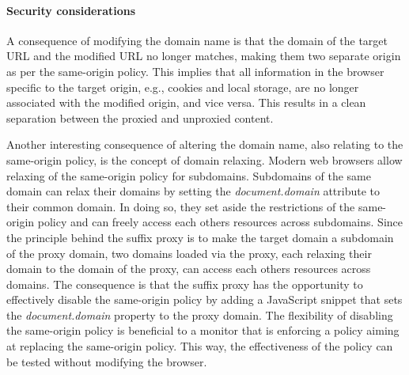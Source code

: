 \documentclass{llncs}
\newcommand{\todo}[1]{\colorbox{red}{\textcolor{white}{\sffamily\bfseries\scriptsize TODO}} \textcolor{red}{#1} \textcolor{red}{$\blacktriangleleft$}}
\begin{document}






\paragraph{Security considerations}

A consequence of modifying the domain name is that the domain of the
target URL and the modified URL no longer matches, making them two 
separate origin as per the same-origin policy. This implies that all information in 
the browser specific to the target origin, e.g., cookies and local storage, 
are no longer associated with the modified origin, and vice versa. This results 
in a clean separation between the proxied and unproxied content.  

Another interesting consequence of altering the domain name, also relating to 
the same-origin policy, is the concept of domain relaxing. Modern web browsers 
allow relaxing of the same-origin policy for subdomains. Subdomains of the same 
domain can relax their domains by setting the \emph{document.domain} attribute
to their common domain. In doing so, they set aside the restrictions of the 
same-origin policy and can freely access each others resources across subdomains. 
Since the principle behind the suffix proxy is to make the target domain a subdomain of the proxy domain, two 
domains loaded via the proxy, each relaxing their domain to the domain of the 
proxy, can access each others resources across domains.
The consequence is that the suffix proxy has the opportunity to effectively disable the same-origin 
policy by adding a JavaScript snippet that sets the \emph{document.domain} property
to the proxy domain. The flexibility of disabling the same-origin policy is beneficial to a monitor that is enforcing a policy aiming 
at replacing the same-origin policy. This way, the effectiveness of the policy 
can be tested without modifying the browser.
\end{document}
